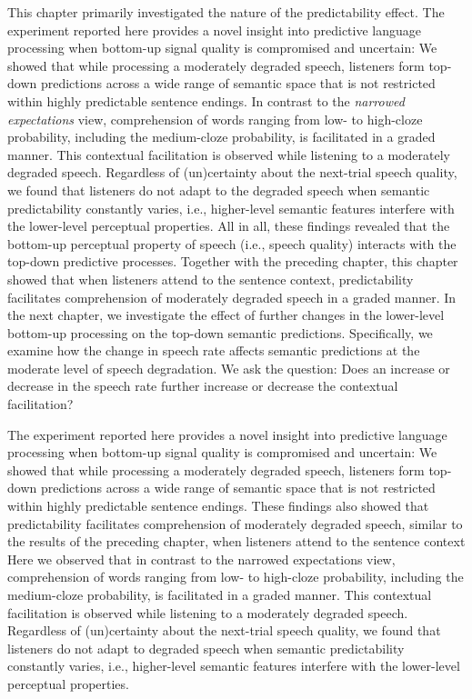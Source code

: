 \documentclass[a4paper, nobind]{templates/ociamthesis}
\begin{document}
This chapter primarily investigated the nature of the predictability effect.
The experiment reported here provides a novel insight into predictive language processing when bottom-up signal quality is compromised and uncertain:
We showed that while processing a moderately degraded speech, listeners form top-down predictions across a wide range of semantic space that is not restricted within highly predictable sentence endings.
In contrast to the \emph{narrowed expectations} view, comprehension of words ranging from low- to high-cloze probability, including the medium-cloze probability, is facilitated in a graded manner.
This contextual facilitation is observed while listening to a moderately degraded speech.
Regardless of (un)certainty about the next-trial speech quality, we found that listeners do not adapt to the degraded speech when semantic predictability constantly varies,
i.e., higher-level semantic features interfere with the lower-level perceptual properties.
All in all, these findings revealed that the bottom-up perceptual property of speech (i.e., speech quality) interacts with the top-down predictive processes.
Together with the preceding chapter, this chapter showed that when listeners attend to the sentence context, predictability facilitates comprehension of moderately degraded speech in a graded manner.
In the next chapter,
we investigate the effect of further changes in the lower-level bottom-up processing on the top-down semantic predictions.
Specifically, we examine how the change in speech rate affects semantic predictions at the moderate level of speech degradation.
We ask the question:
Does an increase or decrease in the speech rate further increase or decrease the contextual facilitation?

The experiment reported here provides a novel insight into predictive language processing when bottom-up signal quality is compromised and uncertain: We showed that while processing a moderately degraded speech, listeners form top-down predictions across a wide range of semantic space that is not restricted within highly predictable sentence endings.
These findings also showed that predictability facilitates comprehension of moderately degraded speech, similar to the results of the preceding chapter, when listeners attend to the sentence context
Here we observed that in contrast to the narrowed expectations view, comprehension of words ranging from low- to high-cloze probability, including the medium-cloze probability, is facilitated in a graded manner.
This contextual facilitation is observed while listening to a moderately degraded speech.
Regardless of (un)certainty about the next-trial speech quality, we found that listeners do not adapt to degraded speech when semantic predictability constantly varies, i.e., higher-level semantic features interfere with the lower-level perceptual properties.
\end{document}

